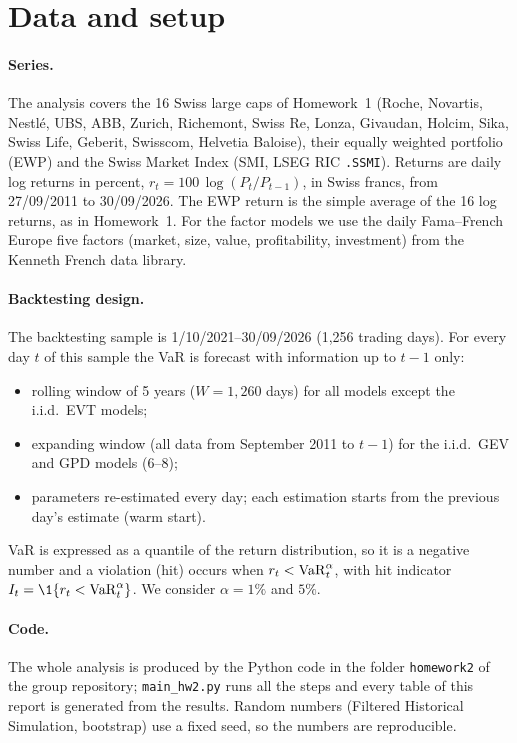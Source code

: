 \section{Data and setup}\label{sec:data}

\paragraph{Series.} The analysis covers the 16 Swiss large caps of Homework~1 (Roche, Novartis, Nestl\'e, UBS, ABB,
Zurich, Richemont, Swiss Re, Lonza, Givaudan, Holcim, Sika, Swiss Life, Geberit, Swisscom, Helvetia Baloise), their
equally weighted portfolio (EWP) and the Swiss Market Index (SMI, LSEG RIC \texttt{.SSMI}). Returns are daily log
returns in percent, $r_t = 100\,\log(P_t/P_{t-1})$, in Swiss francs, from 27/09/2011 to 30/09/2026. The EWP return is the
simple average of the 16 log returns, as in Homework~1. For the factor models we use the daily Fama--French Europe
five factors \citep{fama2015} (market, size, value, profitability, investment) from the Kenneth French data library.

\paragraph{Backtesting design.} The backtesting sample is 1/10/2021--30/09/2026 (1{,}256 trading days). For every day $t$
of this sample the VaR is forecast with information up to $t-1$ only:
\begin{itemize}
  \item rolling window of 5 years ($W = 1{,}260$ days) for all models except the i.i.d.\ EVT models;
  \item expanding window (all data from September 2011 to $t-1$) for the i.i.d.\ GEV and GPD models (6--8);
  \item parameters re-estimated every day; each estimation starts from the previous day's estimate (warm start).
\end{itemize}
VaR is expressed as a quantile of the return distribution, so it is a negative number and a violation (hit) occurs
when $r_t < \mathrm{VaR}_t^\alpha$, with hit indicator $I_t = \1\{r_t < \VaR_t^\alpha\}$. We consider $\alpha = 1\%$ and $5\%$.

\paragraph{Code.} The whole analysis is produced by the Python code in the folder \texttt{homework2} of the group
repository; \texttt{main\_hw2.py} runs all the steps and every table of this report is generated from the results.
Random numbers (Filtered Historical Simulation, bootstrap) use a fixed seed, so the numbers are reproducible.
